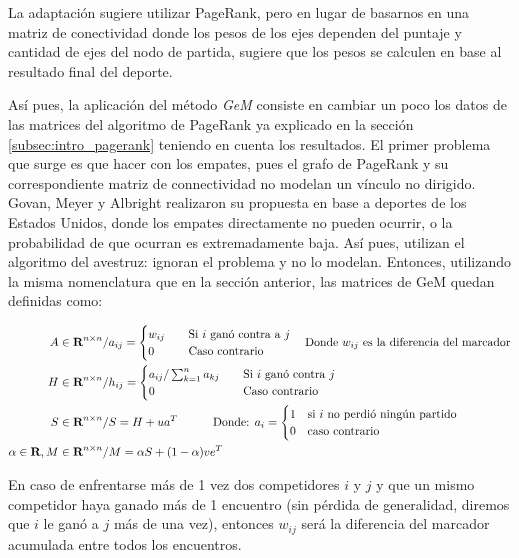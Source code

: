\par La adaptaci\'on sugiere utilizar PageRank, pero en lugar de basarnos en una
matriz de conectividad donde los pesos de los ejes dependen del puntaje y
cantidad de ejes del nodo de partida, sugiere que los pesos se calculen en base
al resultado final del deporte.

\par As\'i pues, la aplicaci\'on del m\'etodo \emph{GeM} consiste en cambiar un
poco los datos de las matrices del algoritmo de PageRank ya explicado en la
secci\'on \ref{subsec:intro_pagerank} teniendo en cuenta los resultados. El
primer problema que surge es que hacer con los empates, pues el grafo de
PageRank y su correspondiente matriz de connectividad no modelan un v\'inculo no
dirigido. Govan, Meyer y Albright realizaron su propuesta en base a deportes de
los Estados Unidos, donde los empates directamente no pueden ocurrir, o la
probabilidad de que ocurran es extremadamente baja. As\'i pues, utilizan el
algoritmo del avestruz: ignoran el problema y no lo modelan. Entonces,
utilizando la misma nomenclatura que en la secci\'on anterior, las matrices de
GeM quedan definidas como:

\begin{align}
    A\in\real^{n\times n} /& a_{ij} = \begin{cases}
        w_{ij}\quad&\text{Si $i$ gan\'o contra a $j$}\\
        0\quad&\text{Caso contrario}
    \end{cases}\quad\text{Donde $w_{ij}$ es la diferencia del marcador}\\
%
    H\in\real^{n\times n} /& h_{ij} = \begin{cases}
        a_{ij}/\sum_{k=1}^n a_{kj}\quad&\text{Si $i$ gan\'o contra $j$}\\
        0\quad&\text{Caso contrario}
    \end{cases}\\
%
    S\in\real^{n\times n} /& S = H + ua^T \quad\quad\quad
        \text{Donde: } a_i =
        \begin{cases}
            1 &\text{si $i$ no perdi\'o ning\'un partido}\\
            0 &\text{caso contrario}
        \end{cases}\\
%
    \alpha\in\real, M\in\real^{n\times n} /& M = \alpha S + (1-\alpha)ve^T
\end{align}

\par En caso de enfrentarse m\'as de 1 vez dos competidores $i$ y $j$ y que un
mismo competidor haya ganado m\'as de 1 encuentro (sin p\'erdida de generalidad,
diremos que $i$ le gan\'o a $j$ m\'as de una vez), entonces $w_{ij}$ ser\'a la
diferencia del marcador acumulada entre todos los encuentros.

